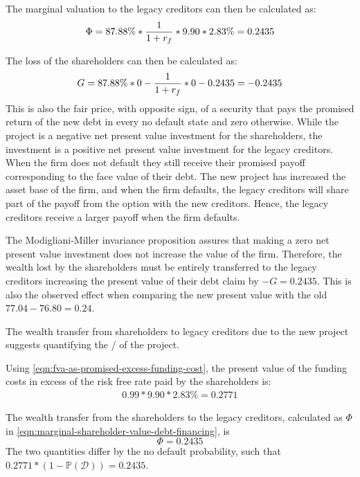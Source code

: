 \documentclass[main.tex]{subfiles}
\begin{document}
        The marginal valuation to the legacy creditors can then be calculated as:
        \begin{equation}
            \Phi 
            = 87.88\% * \frac{1}{1+r_{f}}  * 9.90 * 2.83\% 
            = 0.2435
        \end{equation}

        The loss of the shareholders can then be calculated as: 
            \begin{align}
                G = 87.88\%*0 - \frac{1}{1+r_{f}} * 0 - 0.2435 = -0.2435
            \end{align}
        This is also the fair price, with opposite sign, 
        of a security that pays the promised return of the new debt in every no default state and zero otherwise. 
        While the project is a negative net present value investment for the shareholders,
        the investment is a positive net present value investment for the legacy creditors.
        When the firm does not default they still receive their promised payoff 
        corresponding to the face value of their debt.
        The new project has increased the asset base of the firm, and when the firm defaults, 
        the legacy creditors will share part of the payoff from the option with the new creditors.
        Hence, the legacy creditors receive a larger payoff when the firm defaults. 

        The Modigliani-Miller invariance proposition assures that making a zero net present value investment 
        does not increase the value of the firm.
        Therefore, the wealth lost by the shareholders must be entirely transferred to the legacy creditors 
        increasing the present value of their debt claim by $-G = 0.2435$. 
        This is also the observed effect when comparing the new present value with the old 
        $77.04 - 76.80 = 0.24$.

        The wealth transfer from shareholders to legacy creditors due to the new project 
        suggests quantifying the \FVA/ of the project. 

        Using \cref{eqn:fva-as-promised-excess-funding-cost}, the present value of the funding costs 
        in excess of the risk free rate paid by the shareholders is: 
        \begin{align}
            0.99 * 9.90 * 2.83\% = 0.2771
        \end{align}

        The wealth transfer from the shareholders to the legacy creditors, 
        calculated as $\Phi$ in \cref{eqn:marginal-shareholder-value-debt-financing}, is
        \begin{equation}
            \Phi = 0.2435
        \end{equation}
        The two quantities differ by the no default probability, such that 
        $0.2771 * (1-\mathbb{P}\left(\mathcal{D}\right)) = 0.2435$.
\end{document}

